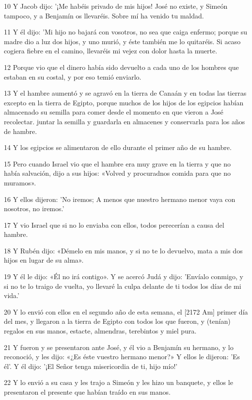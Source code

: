 \par 10 Y Jacob dijo: '¡Me habéis privado de mis hijos! José no existe, y Simeón tampoco, y a Benjamín os llevaréis. Sobre mí ha venido tu maldad.
\par 11 Y él dijo: 'Mi hijo no bajará con vosotros, no sea que caiga enfermo; porque su madre dio a luz dos hijos, y uno murió, y éste también me lo quitaréis. Si acaso cogiera fiebre en el camino, llevaréis mi vejez con dolor hasta la muerte.
\par 12 Porque vio que el dinero había sido devuelto a cada uno de los hombres que estaban en su costal, y por eso temió enviarlo.
\par 13 Y el hambre aumentó y se agravó en la tierra de Canaán y en todas las tierras excepto en la tierra de Egipto, porque muchos de los hijos de los egipcios habían almacenado su semilla para comer desde el momento en que vieron a José recolectar. juntar la semilla y guardarla en almacenes y conservarla para los años de hambre.
\par 14 Y los egipcios se alimentaron de ello durante el primer año de su hambre.
\par 15 Pero cuando Israel vio que el hambre era muy grave en la tierra y que no había salvación, dijo a sus hijos: «Volved y procuradnos comida para que no muramos».
\par 16 Y ellos dijeron: 'No iremos; A menos que nuestro hermano menor vaya con nosotros, no iremos.'
\par 17 Y vio Israel que si no lo enviaba con ellos, todos perecerían a causa del hambre.
\par 18 Y Rubén dijo: «Démelo en mis manos, y si no te lo devuelvo, mata a mis dos hijos en lugar de su alma».
\par 19 Y él le dijo: «Él no irá contigo». Y se acercó Judá y dijo: 'Envíalo conmigo, y si no te lo traigo de vuelta, yo llevaré la culpa delante de ti todos los días de mi vida.'
\par 20 Y lo envió con ellos en el segundo año de esta semana, el [2172 Am] primer día del mes, y llegaron a la tierra de Egipto con todos los que fueron, y (tenían) regalos en sus manos, estacte, almendras, terebintos y miel pura.
\par 21 Y fueron y se presentaron ante José, y él vio a Benjamín su hermano, y lo reconoció, y les dijo: «¿Es éste vuestro hermano menor?» Y ellos le dijeron: 'Es él'. Y él dijo: '¡El Señor tenga misericordia de ti, hijo mío!'
\par 22 Y lo envió a su casa y les trajo a Simeón y les hizo un banquete, y ellos le presentaron el presente que habían traído en sus manos.
